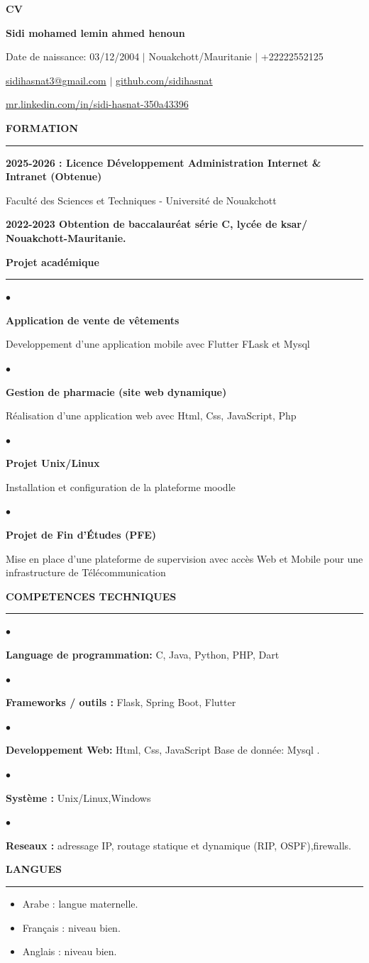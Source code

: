 \documentclass[10.5pt,a4paper]{article}
\newcommand{\cvsection}[1]{%
  \vspace{0.46cm}%
  {\large\bfseries\color{accent} #1}\par
  \vspace{0.08cm}%
  {\color{accent}\rule{\textwidth}{0.75pt}}\par
  \vspace{0.16cm}%
}
\newcommand{\project}[2]{%
  \begin{minipage}[t]{0.025\textwidth}\color{accent}\large$\bullet$\end{minipage}%
  \begin{minipage}[t]{0.955\textwidth}
    {\bfseries #1}\par
    \vspace{0.03cm}#2
  \end{minipage}\par\vspace{0.11cm}
}
\newcommand{\skill}[2]{%
  \begin{minipage}[t]{0.025\textwidth}\color{accent}\large$\bullet$\end{minipage}%
  \begin{minipage}[t]{0.955\textwidth}
    {\bfseries #1} #2
  \end{minipage}\par\vspace{0.07cm}
}
\begin{document}
\color{textgray}

\begin{center}
  {\fontsize{26}{29}\selectfont\bfseries\color{accent} CV}\par
  \vspace{0.22cm}
  {\fontsize{16}{19}\selectfont\bfseries Sidi mohamed lemin ahmed henoun}\par
  \vspace{0.18cm}
  {\small Date de naissance: 03/12/2004 \quad $\vert$ \quad Nouakchott/Mauritanie \quad $\vert$ \quad +22222552125}\par
  \vspace{0.07cm}
  {\small \href{mailto:sidihasnat3@gmail.com}{sidihasnat3@gmail.com} \quad $\vert$ \quad
  \href{https://github.com/sidihasnat}{github.com/sidihasnat}}\par
  \vspace{0.07cm}
  {\small \href{https://mr.linkedin.com/in/sidi-hasnat-350a43396}{mr.linkedin.com/in/sidi-hasnat-350a43396}}\par
\end{center}

\cvsection{FORMATION}
{\bfseries 2025-2026 : Licence Développement Administration Internet \& Intranet (Obtenue)}\par
\vspace{0.08cm}
Faculté des Sciences et Techniques - Université de Nouakchott\par
\vspace{0.08cm}
{\bfseries 2022-2023 Obtention de baccalauréat série C, lycée de ksar/ Nouakchott-Mauritanie.}

\cvsection{Projet académique}
\project{Application de vente de vêtements}{Developpement d’une application mobile avec Flutter FLask et Mysql}
\project{Gestion de pharmacie (site web dynamique)}{Réalisation d’une application web avec Html, Css, JavaScript, Php}
\project{Projet Unix/Linux}{Installation et configuration de la plateforme moodle}
\project{Projet de Fin d'Études (PFE)}{Mise en place d’une plateforme de supervision avec accès Web et Mobile pour une infrastructure de Télécommunication}

\cvsection{COMPETENCES TECHNIQUES}
\skill{Language de programmation:}{C, Java, Python, PHP, Dart}
\skill{Frameworks / outils :}{Flask, Spring Boot, Flutter}
\skill{Developpement Web:}{Html, Css, JavaScript Base de donnée: Mysql .}
\skill{Système :}{Unix/Linux,Windows}
\skill{Reseaux :}{adressage IP, routage statique et dynamique (RIP, OSPF),firewalls.}

\cvsection{LANGUES}
\begin{itemize}[leftmargin=0.65cm,itemsep=0.06cm,topsep=0.03cm,label=\textcolor{accent}{$\bullet$}]
  \item Arabe : langue maternelle.
  \item Français : niveau bien.
  \item Anglais : niveau bien.
\end{itemize}
\end{document}
